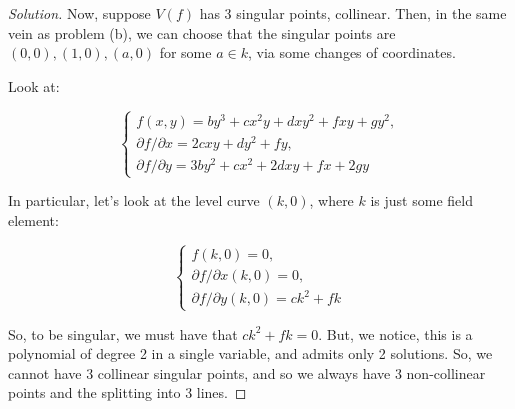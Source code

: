 \documentclass[10pt]{article}
\begin{document}
\begin{proof}[Solution]
Now, suppose $V(f)$ has 3 singular points, collinear. Then, in the same vein as problem (b), we can choose that the singular points are $(0,0), (1,0), (a,0)$ for some $a \in k$, via some changes of coordinates.

Look at:

$$ \begin{cases} f(x,y) = by^3 + cx^2y + dxy^2 + fxy + gy^2,\\ \partial f/\partial x =  2cxy + dy^2 + fy,\\  \partial f/ \partial y = 3by^2 + cx^2 + 2dxy + fx + 2gy \end{cases}$$

In particular, let's look at the level curve $(k,0)$, where $k$ is just some field element:

$$ \begin{cases} f(k,0) = 0,\\ \partial f/\partial x(k,0) = 0,\\  \partial f/ \partial y(k,0) = ck^2 + fk\end{cases}$$

So, to be singular, we must have that $ck^2 + fk = 0$. But, we notice, this is a polynomial of degree 2 in a single variable, and admits only 2 solutions. So, we cannot have 3 collinear singular points, and so we always have 3 non-collinear points and the splitting into 3 lines.

\end{proof}
\end{document}
